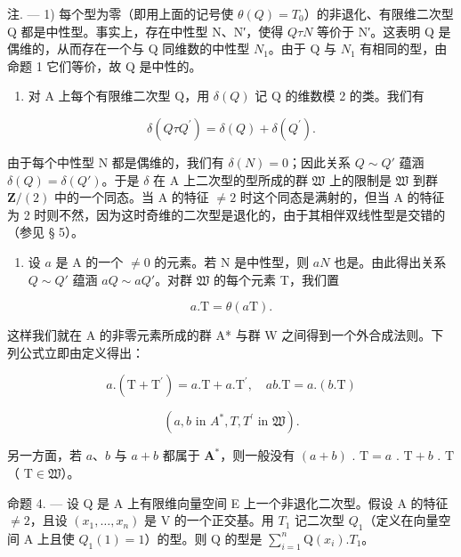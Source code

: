 注. --- 1) 每个型为零（即用上面的记号使 \(\theta(Q) = T_0\)）的非退化、有限维二次型 Q 都是中性型。事实上，存在中性型 N、N′，使得 \(Q \tau N\) 等价于 N′。这表明 Q 是偶维的，从而存在一个与 Q 同维数的中性型 \(N_1\)。由于 Q 与 \(N_1\) 有相同的型，由命题 1 它们等价，故 Q 是中性的。

\begin{enumerate}
\def\labelenumi{\arabic{enumi})}
\setcounter{enumi}{1}
\tightlist
\item
  对 A 上每个有限维二次型 Q，用 \(\delta(Q)\) 记 Q 的维数模 2 的类。我们有
\end{enumerate}

\[
\delta (Q \tau Q ^ {\prime}) = \delta (Q) + \delta (Q ^ {\prime}).
\]

  由于每个中性型 N 都是偶维的，我们有 \(\delta(N) = 0\)；因此关系 \(Q \sim Q'\) 蕴涵 \(\delta(Q) = \delta(Q')\)。于是 \(\delta\) 在 A 上二次型的型所成的群 \(\mathfrak{W}\) 上的限制是 \(\mathfrak{W}\) 到群 \(\mathbf{Z}/(2)\) 中的一个同态。当 A 的特征 \(\neq 2\) 时这个同态是满射的，但当 A 的特征为 2 时则不然，因为这时奇维的二次型是退化的，由于其相伴双线性型是交错的（参见 § 5）。

\begin{enumerate}
\def\labelenumi{\arabic{enumi})}
\setcounter{enumi}{2}
\tightlist
\item
  设 \(a\) 是 A 的一个 \(\neq 0\) 的元素。若 N 是中性型，则 \(aN\) 也是。由此得出关系 \(Q \sim Q'\) 蕴涵 \(aQ \sim aQ'\)。对群 \(\mathfrak{W}\) 的每个元素 T，我们置
\end{enumerate}

\[
a. \mathrm{T} = \theta (a \mathrm{T}).\tag{3}
\]

  这样我们就在 A 的非零元素所成的群 A* 与群 W 之间得到一个外合成法则。下列公式立即由定义得出：

\[
a. (\mathrm{T} + \mathrm{T} ^ {\prime}) = a. \mathrm{T} + a. \mathrm{T} ^ {\prime}, \quad a b. \mathrm{T} = a. (b. \mathrm{T})\tag{4}
\]

\[
(a, b \text {   in   } A ^ {*}, T, T ^ {\prime} \text {   in   } \mathfrak {W}).
\]

  另一方面，若 \(a\)、\(b\) 与 \(a + b\) 都属于 \(\mathbf{A}^*\)，则一般没有 \((a + b)\) . \(\mathrm{T} = a\) . \(\mathrm{T} + b\) . \(\mathrm{T}\)（ \(\mathrm{T} \in \mathfrak{W}\)）。

命题 4. --- 设 Q 是 A 上有限维向量空间 E 上一个非退化二次型。假设 A 的特征 \(\neq 2\)，且设 \((x_{1},\ldots,x_{n})\) 是 V 的一个正交基。用 \(T_{1}\) 记二次型 \(Q_{1}\)（定义在向量空间 A 上且使 \(Q_{1}(1)=1\)）的型。则 Q 的型是 \(\sum_{i=1}^{n}\mathrm{Q}(x_{i}).T_{1}\)。


